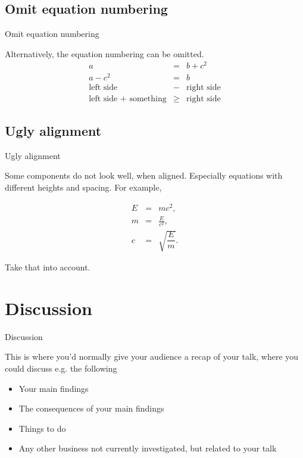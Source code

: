 \documentclass[aspectratio=169]{beamer}
\begin{document}
\subsection{Omit equation numbering}

\begin{frame}{Omit equation numbering}

Alternatively, the equation numbering can be omitted.
\begin{eqnarray*}
a &=& b + c^2 \\
a - c^2 &=& b \\
\text{left side} &-& \text{right side} \\
\text{left side + something} &\geq& \text{right side}
\end{eqnarray*}

\end{frame}

\subsection{Ugly alignment}

\begin{frame}{Ugly alignment}

Some components do not look well, when aligned. Especially equations with different heights and spacing. For example,

\begin{eqnarray}
E &=& mc^2, \\
m &=& \frac{E}{c^2}, \\
c &=& \sqrt{\dfrac{E}{m}}.
\end{eqnarray}

Take that into account.

\end{frame}


\section{Discussion}
\begin{frame}{Discussion}

This is where you'd normally give your audience a recap of your talk, where you could discuss e.g. the following

\begin{itemize}
    \item Your main findings
    \item The consequences of your main findings
    \item Things to do
    \item Any other business not currently investigated, but related to your talk
\end{itemize}
    
\end{frame}
\end{document}
